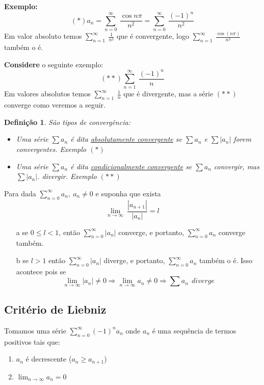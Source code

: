 \documentclass[12pt,openany]{book}
\newtheorem{definition}{Definição}[section]
\begin{document}
\textbf{Exemplo:} $$(*) a_n = \sum_{n=0}^{\infty} \ \frac{\cos n\pi}{n^2} = \sum_{n=0}^{\infty} \ \frac{(-1)^n}{n^2}$$ Em valor absoluto temos $\displaystyle{\sum_{n=1}^{\infty} \ \frac{1}{n^2}}$ que é convergente, logo $\displaystyle{\sum_{n=1}^{\infty} \ \frac{\cos(n\pi)}{n^2}}$ também o é.

\textbf{Considere} o seguinte exemplo: $$(**) \sum_{n=1}^{\infty} \ \frac{(-1)^n}{n}$$ Em valores absolutos temos $\displaystyle{\sum_{n=1}^{\infty} \ \frac{1}{n}}$ que é divergente, mas a série $(**)$ converge como veremos a seguir. 

\begin{definition} São tipos de convergência:
\begin{itemize}
\item Uma série $\sum a_n$ é dita \underline{absolutamente convergente} se $\sum a_n$ e $\sum |a_n|$ forem convergentes. Exemplo $(*)$
\item Uma série $\sum a_n$ é dita \underline{condicionalmente convergente} se $\sum a_n$ convergir, mas $\sum |a_n|$. divergir. Exemplo $(**)$
\end{itemize}
\end{definition}

Para dada $\displaystyle{\sum_{n=0}^{\infty} a_n, \ a_n \neq 0}$ e suponha que exista $$\lim_{n \rightarrow \infty} \ \frac{|a_{n+1}|}{|a_n|} = l$$

\begin{itemize}
\item [a] se $0 \leq l <1$, então $\displaystyle{\sum_{n=0}^{\infty} |a_n|}$ converge, e portanto, $\displaystyle{\sum_{n=0}^{\infty} a_n}$ converge também.
\item [b] se $l > 1$ então $\displaystyle{\sum_{n=0}^{\infty} |a_n|}$ diverge, e portanto, $\displaystyle{\sum_{n=0}^{\infty} a_n}$ também o é. Isso acontece pois se $$ \lim_{n \rightarrow \infty} |a_n| \neq 0 \Rightarrow \lim_{n \rightarrow \infty} a_n \neq 0 \Rightarrow \sum a_n \ \ diverge$$
\end{itemize}

\subsection{Critério de Liebniz}
\label{subsec:2121}

\hspace{5mm}Tomamos uma série $\displaystyle{\sum_{n=0}^{\infty} (-1)^n a_n}$ onde $a_n$ é uma sequência de termos positivos tais que: \begin{enumerate}
\item $a_n$ é decrescente ($a_n \geq a_{n+1}$)
\item $\displaystyle{\lim_{n \rightarrow \infty} a_n = 0}$
\end{enumerate}
\end{document}
